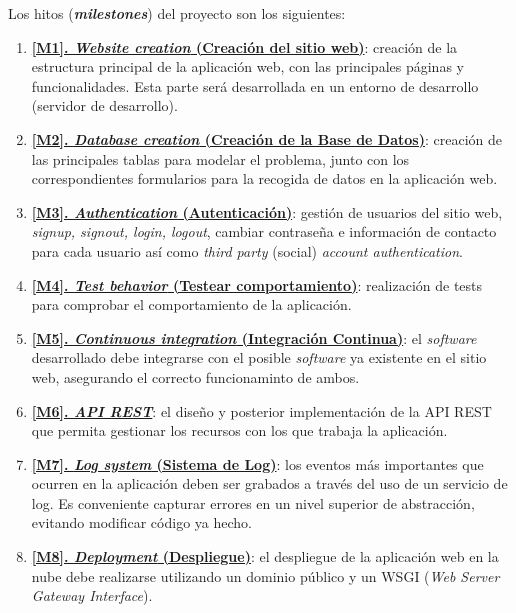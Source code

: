 Los hitos (\textbf{\textit{milestones}}) del proyecto son los siguientes:
\begin{enumerate}
    \item \textbf{\href{https://github.com/alexespana/TFG/milestone/1}{[M1].
    \textit{Website creation} (Creación del sitio web)}}: creación de la estructura
    principal de la aplicación web, con las principales páginas y funcionalidades. Esta
    parte será desarrollada en un entorno de desarrollo (servidor de desarrollo).
    \item \textbf{\href{https://github.com/alexespana/TFG/milestone/8}{[M2].
    \textit{Database creation} (Creación de la Base de Datos)}}: creación de las principales
    tablas para modelar el problema, junto con los correspondientes formularios para la
    recogida de datos en la aplicación web.
    \item \textbf{\href{https://github.com/alexespana/TFG/milestone/2}{[M3].
    \textit{Authentication} (Autenticación)}}: gestión de usuarios del sitio web,
    \textit{signup, signout, login, logout}, cambiar contraseña e información de contacto
    para cada usuario así como \textit{third party} (social) \textit{account authentication}. 
    \item \textbf{\href{https://github.com/alexespana/TFG/milestone/3}{[M4].
    \textit{Test behavior} (Testear comportamiento)}}: realización de tests para comprobar
    el comportamiento de la aplicación.
    \item \textbf{\href{https://github.com/alexespana/TFG/milestone/4}{[M5].
    \textit{Continuous integration} (Integración Continua)}}: el \textit{software}
    desarrollado debe integrarse con el posible \textit{software} ya existente en el sitio
    web, asegurando el correcto funcionaminto de ambos.
    \item \textbf{\href{https://github.com/alexespana/TFG/milestone/6}{[M6].
    \textit{API REST}}}: el diseño y posterior implementación de la API REST que permita
    gestionar los recursos con los que trabaja la aplicación.
    \item \textbf{\href{https://github.com/alexespana/TFG/milestone/5}{[M7].
    \textit{Log system} (Sistema de Log)}}: los eventos más importantes que ocurren en la
    aplicación deben ser grabados a través del uso de un servicio de log. Es conveniente
    capturar errores en un nivel superior de abstracción, evitando modificar código ya hecho.
    \item \textbf{\href{https://github.com/alexespana/TFG/milestone/7}{[M8].
    \textit{Deployment} (Despliegue)}}: el despliegue de la aplicación web en la nube debe
    realizarse utilizando un dominio público y un WSGI (\textit{Web Server Gateway Interface}).
\end{enumerate}

